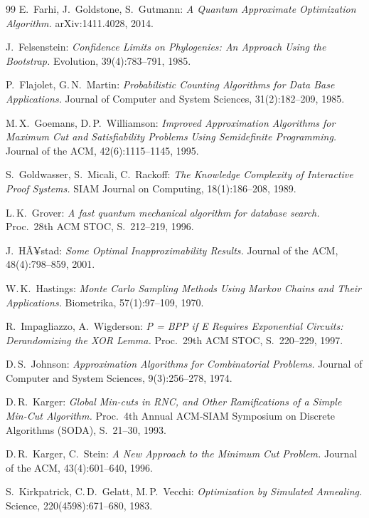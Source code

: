 ﻿\documentclass[12pt,a4paper]{article}
\theoremstyle{definition}
\theoremstyle{plain}
\theoremstyle{remark}
\begin{document}
\begin{thebibliography}{99}
E.\ Farhi, J.\ Goldstone, S.\ Gutmann:
\textit{A Quantum Approximate Optimization Algorithm.}
arXiv:1411.4028, 2014.

J.\ Felsenstein:
\textit{Confidence Limits on Phylogenies: An Approach Using the Bootstrap.}
Evolution, 39(4):783--791, 1985.

P.\ Flajolet, G.\,N.\ Martin:
\textit{Probabilistic Counting Algorithms for Data Base Applications.}
Journal of Computer and System Sciences, 31(2):182--209, 1985.

M.\,X.\ Goemans, D.\,P.\ Williamson:
\textit{Improved Approximation Algorithms for Maximum Cut and Satisfiability Problems Using Semidefinite Programming.}
Journal of the ACM, 42(6):1115--1145, 1995.

S.\ Goldwasser, S.\ Micali, C.\ Rackoff:
\textit{The Knowledge Complexity of Interactive Proof Systems.}
SIAM Journal on Computing, 18(1):186--208, 1989.

L.\,K.\ Grover:
\textit{A fast quantum mechanical algorithm for database search.}
Proc.\ 28th ACM STOC, S.~212--219, 1996.

J.\ HÃ¥stad:
\textit{Some Optimal Inapproximability Results.}
Journal of the ACM, 48(4):798--859, 2001.

W.\,K.\ Hastings:
\textit{Monte Carlo Sampling Methods Using Markov Chains and Their Applications.}
Biometrika, 57(1):97--109, 1970.

R.\ Impagliazzo, A.\ Wigderson:
\textit{P = BPP if E Requires Exponential Circuits:
Derandomizing the XOR Lemma.}
Proc.\ 29th ACM STOC, S.~220--229, 1997.

D.\,S.\ Johnson:
\textit{Approximation Algorithms for Combinatorial Problems.}
Journal of Computer and System Sciences, 9(3):256--278, 1974.

D.\,R.\ Karger:
\textit{Global Min-cuts in RNC, and Other Ramifications of a Simple Min-Cut Algorithm.}
Proc.\ 4th Annual ACM-SIAM Symposium on Discrete Algorithms (SODA), S.~21--30, 1993.

D.\,R.\ Karger, C.\ Stein:
\textit{A New Approach to the Minimum Cut Problem.}
Journal of the ACM, 43(4):601--640, 1996.

S.\ Kirkpatrick, C.\,D.\ Gelatt, M.\,P.\ Vecchi:
\textit{Optimization by Simulated Annealing.}
Science, 220(4598):671--680, 1983.


\end{thebibliography}
\end{document}
